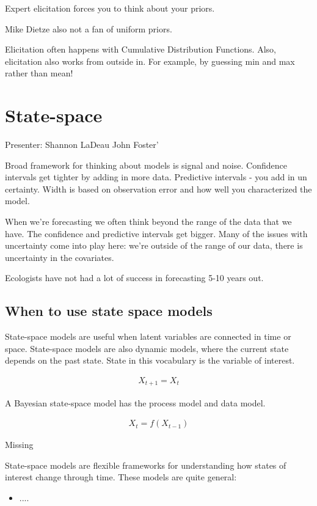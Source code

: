 \documentclass[12pt, oneside]{article}   	%
\begin{document}
Expert elicitation forces you to think about your priors. 

Mike Dietze also not a fan of uniform priors.

Elicitation often happens with Cumulative Distribution Functions. Also, elicitation also works from outside in. For example, by guessing min and max rather than mean!

\section{State-space}

Presenter: Shannon LaDeau John Foster'

Broad framework for thinking about models is signal and noise. Confidence intervals get tighter by adding in more data. Predictive intervals - you add in un certainty. Width is based on observation error and how well you characterized the model. 

When we're forecasting we often think beyond the range of the data that we have. The confidence and predictive intervals get bigger. Many of the issues with uncertainty come into play here: we're outside of the range of our data, there is uncertainty in the covariates. 

Ecologists have not had a lot of success in forecasting 5-10 years out. 

\subsection{When to use state space models}

State-space models are useful when latent variables are connected in time or space. State-space models are also dynamic models, where the current state depends on the past state. State in this vocabulary is the variable of interest. 

\begin{align}
X_{t+1} = X_t
\end{align}

A Bayesian state-space model has the process model and data model. 

\begin{align}
X_{t} = f(X_{t-1})
\end{align}

Missing

State-space models are flexible frameworks for understanding how states of interest change through time. These models are quite general:

\begin{itemize}
\item ....
\end{itemize}
\end{document}
